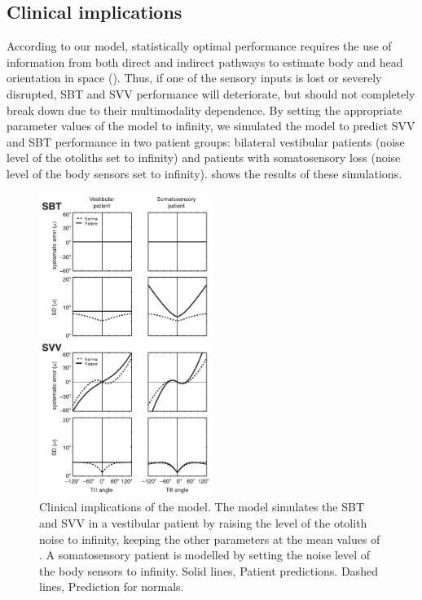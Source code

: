 \subsection{Clinical implications}
 
According to our model, statistically optimal performance requires the use of information from both direct and indirect pathways to estimate body and head orientation in space (). Thus, if one of the sensory inputs is lost or severely disrupted, SBT and SVV performance will deteriorate, but should not completely break down due to their multimodality dependence. By setting the appropriate parameter values of the model to infinity, we simulated the model to predict SVV and SBT performance in two patient groups: bilateral vestibular patients (noise level of the otoliths set to infinity) and patients with somatosensory loss (noise level of the body sensors set to infinity).  shows the results of these simulations. 

\begin{figure}
    \includegraphics[width=0.5\textwidth]{src/paper1/figure7.pdf}
    
    \caption{Clinical implications of the model. The model simulates the SBT and SVV in a vestibular patient by raising the level of the otolith noise to infinity, keeping the other parameters at the mean values of . A somatosensory patient is modelled by setting the noise level of the body sensors to infinity. Solid lines, Patient predictions. Dashed lines, Prediction for normals.}
    \label{p1:fig7}
\end{figure}

